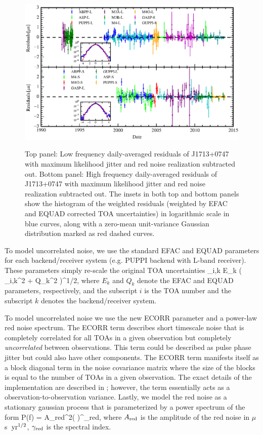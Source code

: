 \begin{figure}[!ht]
\centering
\includegraphics[scale=1.0]{fig4.eps} \\ 
\caption{\label{fig:detres} Top panel: Low frequency daily-averaged residuals of J1713+0747 with maximum likelihood
jitter and red noise realization subtracted out. Bottom panel: High frequency
daily-averaged residuals of J1713+0747 with maximum likelihood jitter and red
noise realization subtracted out. The insets in both top and bottom panels
show the histogram of the weighted residuals (weighted by EFAC and EQUAD
corrected TOA uncertainties) in logarithmic scale in blue curves, along with a
zero-mean unit-variance Gaussian distribution marked as red dashed curves.}
\end{figure} 

To model uncorrelated noise, we use the standard EFAC and EQUAD parameters for each
backend/receiver system (e.g. PUPPI backend with L-band receiver). These parameters
simply re-scale the original TOA uncertainties
\be
\sigma_{i,k} \rightarrow  E_{k} \left( \sigma_{i,k}^{2} + Q_{k}^{2}  \right)^{1/2},
\ee
where $E_{k}$ and $Q_{k}$ denote the EFAC and EQUAD parameters, respectively, and the subscript
$i$ is the TOA number and the subscript $k$ denotes the backend/receiver system.

To model uncorrelated noise we use the new ECORR parameter and a power-law red noise spectrum.
The ECORR term describes short timescale noise that is completely correlated
for all TOAs in a given observation
but completely \emph{uncorrelated} between observations. This term could be described as pulse phase jitter \citep{cs10}
but could also have other components. The ECORR term manifests itself as a block diagonal term in the noise covariance
matrix where the size of the blocks is equal to the number of TOAs in a given
observation. The exact details of the implementation are described in
\cite{abb+15b}; however, the term essentially acts as a
observation-to-observation variance. 
Lastly, we model the red noise as a stationary gaussian process that is parameterized by a power spectrum of the form
\be
P(f) = A_{\rm red}^2\left(  \right)^{\gamma_{\rm red}},
\ee
where $A_{\rm red}$ is the amplitude of the red noise in $\mu$s~${\rm yr}^{1/2}$, $\gamma_{\rm red}$ is the spectral index.

